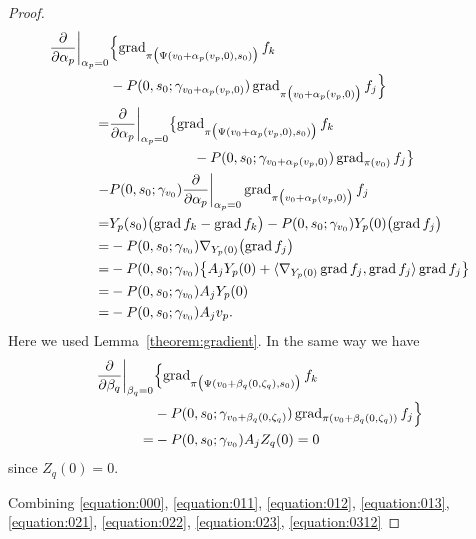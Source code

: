\documentclass[a4paper,11pt,reqno]{amsart}
\numberwithin{equation}{section}
\theoremstyle{definition}
\theoremstyle{remark}
\begin{document}
\begin{proof}
%
%
\begin{align}
  \frac{\partial}{\partial \alpha_p}\bigg\vert_{\alpha_p=0}
& \Bigl\{
  \operatorname{grad}_{\pi\bigl(\Psi(v_0+\alpha_p(v_p,0),s_0)\bigr)}f_k
\nonumber
\\
& -
  P(0,s_0;\gamma_{v_0+\alpha_p(v_p,0)})
  \operatorname{grad}_{\pi\bigl(v_0+\alpha_p(v_p,0)\bigr)}f_j
  \Bigr\}
\nonumber
\\
  =
& \frac{\partial}{\partial \alpha_p}\bigg\vert_{\alpha_p=0}
  \bigl\{
  \operatorname{grad}_{\pi\bigl(\Psi(v_0+\alpha_p(v_p,0),s_0)\bigr)}f_k
\nonumber
\\
& \qquad\qquad\qquad
  -
  P(0,s_0;\gamma_{v_0+\alpha_p(v_p,0)})
  \operatorname{grad}_{\pi(v_0)}f_j
  \bigr\}
\nonumber
\\
  -
& P(0,s_0;\gamma_{v_0})
  \frac{\partial}{\partial \alpha_p}\bigg\vert_{\alpha_p=0}
  \operatorname{grad}_{\pi\bigl(v_0+\alpha_p(v_p,0)\bigr)}f_j
\nonumber
\\
  =
& Y_p(s_0)\bigl(\operatorname{grad}f_k-\operatorname{grad}f_k\bigr)
  -
  P(0,s_0;\gamma_{v_0})Y_p(0)\bigl(\operatorname{grad}f_j\bigr)
\nonumber
\\
  =
& - 
  P(0,s_0;\gamma_{v_0})\nabla_{Y_p(0)}\bigl(\operatorname{grad}f_j\bigr)
\nonumber
\\
  =
& - 
  P(0,s_0;\gamma_{v_0})
  \bigl\{A_jY_p(0)+\langle\nabla_{Y_p(0)}\operatorname{grad}f_j,\operatorname{grad}f_j\rangle\operatorname{grad}f_j\bigr\}
\nonumber
\\
  =
& - 
  P(0,s_0;\gamma_{v_0})A_jY_p(0)
\nonumber
\\
  =
& - 
  P(0,s_0;\gamma_{v_0})A_jv_p. 
\label{equation:0312}
\end{align}
%
%
Here we used Lemma~\ref{theorem:gradient}. 
In the same way we have 
%
%
\begin{align}
  \frac{\partial}{\partial \beta_q}\bigg\vert_{\beta_q=0}
& \Bigl\{
  \operatorname{grad}_{\pi\bigl(\Psi(v_0+\beta_q(0,\zeta_q),s_0)\bigr)}f_k
\nonumber
\\
& -
  P(0,s_0;\gamma_{v_0+\beta_q(0,\zeta_q)})
  \operatorname{grad}_{\pi(v_0+\beta_q(0,\zeta_q))}f_j
  \Bigr\}
\nonumber
\\
  =
& - 
  P(0,s_0;\gamma_{v_0})A_jZ_q(0)
  =
  0
\label{equation:033}
\end{align} 
%
%
since $Z_q(0)=0$. 
%
%
\par
%
%
Combining 
\eqref{equation:000}, 
\eqref{equation:011}, 
\eqref{equation:012}, 
\eqref{equation:013}, 
\eqref{equation:021}, 
\eqref{equation:022}, 
\eqref{equation:023}, 
\eqref{equation:0312} 

\end{proof}
\end{document}
